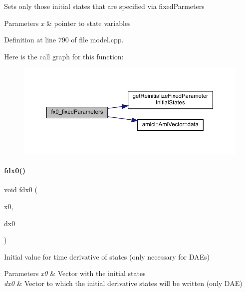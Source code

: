 Sets only those initial states that are specified via fixed\+Parmeters 
\begin{DoxyParams}{Parameters}
{\em x} & pointer to state variables \\
\hline
\end{DoxyParams}


Definition at line 790 of file model.\+cpp.

Here is the call graph for this function\+:
\nopagebreak
\begin{figure}[H]
\begin{center}
\leavevmode
\includegraphics[width=350pt]{classamici_1_1_model_ae517574d2a7c504c388438a08a1aed38_cgraph}
\end{center}
\end{figure}
\mbox{\label{classamici_1_1_model_a8c3a1647a75581d9e2fc5de106d87a0d}} 
\paragraph{\texorpdfstring{fdx0()}{fdx0()}}
{\footnotesize\ttfamily void fdx0 (\begin{DoxyParamCaption}\item[{\mbox{\hyperlink{classamici_1_1_ami_vector}{Ami\+Vector}} $\ast$}]{x0,  }\item[{\mbox{\hyperlink{classamici_1_1_ami_vector}{Ami\+Vector}} $\ast$}]{dx0 }\end{DoxyParamCaption})\hspace{0.3cm}{\ttfamily [virtual]}}

Initial value for time derivative of states (only necessary for D\+A\+Es) 
\begin{DoxyParams}{Parameters}
{\em x0} & Vector with the initial states \\
\hline
{\em dx0} & Vector to which the initial derivative states will be written (only D\+AE) \\
\hline
\end{DoxyParams}


